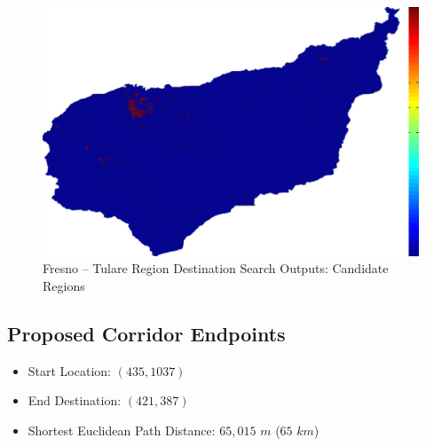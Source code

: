         \begin{figure}[!h]
            \begin{center}
            \includegraphics[width=5.5in]{figures/Fresno_Search_Output.png}   
            \caption{Fresno -- Tulare Region Destination Search Outputs: Candidate Regions}
            \label{fig:Fdsoutputs_cand}
            \end{center}
        \end{figure}

    \subsection{Proposed Corridor Endpoints}
    
    \begin{itemize}
      \setlength{\itemsep}{0cm}
      \setlength{\parskip}{0cm}
        \item Start Location: $(435,1037)$
        \item End Destination: $(421,387)$
        \item Shortest Euclidean Path Distance: $65,015$ $m$ ($65$ $km$)
    \end{itemize}
    
